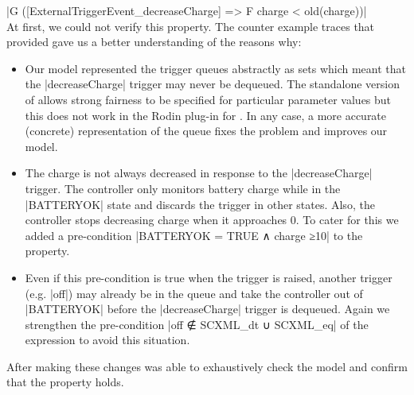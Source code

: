 	|G ([ExternalTriggerEvent_decreaseCharge] => F {charge < old(charge)})|
\\
At first, we could not verify this property.
The counter example traces that \PROB provided gave us a better understanding of the reasons why:
\begin{itemize}
\item
Our model represented the trigger queues abstractly as sets which meant that the |decreaseCharge| trigger may never be dequeued.
The standalone version of \PROB allows strong fairness to be specified for particular parameter values but this does not work in the Rodin plug-in for \PROB. 
In any case, a more accurate (concrete) representation of the queue fixes the problem and improves our model.
\item 
The charge is not always decreased in response to the |decreaseCharge| trigger.
The controller only monitors battery charge while in the |BATTERYOK| state and discards the trigger in other states.
Also, the controller stops decreasing charge when it approaches 0. 
To cater for this we added a pre-condition |BATTERYOK = TRUE ∧ charge ≥10| to the \LTL property.
\item
Even if this pre-condition is true when the trigger is raised, another trigger (e.g. |off|) may already be in the queue and take the controller out of |BATTERYOK| before the |decreaseCharge| trigger is dequeued.
Again we strengthen the pre-condition |off ∉ SCXML_dt ∪ SCXML_eq| of the \LTL expression to avoid this situation.
\\
\end{itemize}
After making these changes \PROB was able to exhaustively check the model and confirm that the \LTL property holds.
